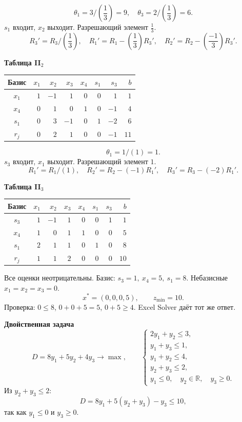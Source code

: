 \documentclass[12pt,a4paper]{article}
\begin{document}
\[\theta_{1}=3/(\frac{1}{3})=9,\quad \theta_{3}=2/(\frac{1}{3})=6.\]
$s_{1}$ входит, $x_{2}$ выходит. Разрешающий элемент $\frac{1}{3}$.
\[R_{3}'=R_{3}/(\frac{1}{3}),\quad R_{1}'=R_{1}-(\frac{1}{3})R_{3}',\quad R_{2}'=R_{2}-(\frac{-1}{3})R_{3}'.\]
\newpage
\par\textbf{Таблица II$_{2}$}\begin{center}\small\setlength{\tabcolsep}{4pt}\begin{tabular}{c|rrrrrr|r}\hline
Базис & $x_{1}$ & $x_{2}$ & $x_{3}$ & $x_{4}$ & $s_{1}$ & \cellcolor{cyan!18}$s_{3}$ & $b$\\\hline
\rowcolor{yellow!25}$x_{1}$ & $1$ & $-1$ & $1$ & $0$ & $0$ & \cellcolor{orange!45}$1$ & $1$\\
$x_{4}$ & $0$ & $1$ & $0$ & $1$ & $0$ & \cellcolor{cyan!18}$-1$ & $4$\\
$s_{1}$ & $0$ & $3$ & $-1$ & $0$ & $1$ & \cellcolor{cyan!18}$-2$ & $6$\\
\hline $r_j$ & $0$ & $2$ & $1$ & $0$ & $0$ & \cellcolor{cyan!18}$-1$ & $11$\\\hline\end{tabular}\end{center}
\[\theta_{1}=1/(1)=1.\]
$s_{3}$ входит, $x_{1}$ выходит. Разрешающий элемент $1$.
\[R_{1}'=R_{1}/(1),\quad R_{2}'=R_{2}-(-1)R_{1}',\quad R_{3}'=R_{3}-(-2)R_{1}'.\]
\par\textbf{Таблица II$_{3}$}\begin{center}\small\setlength{\tabcolsep}{4pt}\begin{tabular}{c|rrrrrr|r}\hline
Базис & $x_{1}$ & $x_{2}$ & $x_{3}$ & $x_{4}$ & $s_{1}$ & $s_{3}$ & $b$\\\hline
$s_{3}$ & $1$ & $-1$ & $1$ & $0$ & $0$ & $1$ & $1$\\
$x_{4}$ & $1$ & $0$ & $1$ & $1$ & $0$ & $0$ & $5$\\
$s_{1}$ & $2$ & $1$ & $1$ & $0$ & $1$ & $0$ & $8$\\
\hline $r_j$ & $1$ & $1$ & $2$ & $0$ & $0$ & $0$ & $10$\\\hline\end{tabular}\end{center}

Все оценки неотрицательны. Базис: $s_3=1,\ x_4=5,\ s_1=8$.
Небазисные $x_1=x_2=x_3=0$.
\[
\boxed{x^*=(0,0,0,5),\qquad z_{\min}=10.}
\]
Проверка: $0\le8$, $0+0+5=5$, $0+5\ge4$.
Excel Solver даёт тот же ответ.

\newpage
\par\textbf{Двойственная задача}
\[
D=8y_1+5y_2+4y_3\to\max,
\qquad
\begin{cases}
2y_1+y_2\le3,\\
y_1+y_3\le1,\\
y_1+y_2\le4,\\
y_2+y_3\le2,\\
y_1\le0,\quad y_2\in\mathbb R,\quad y_3\ge0.
\end{cases}
\]
Из $y_2+y_3\le2$:
\[
D=8y_1+5(y_2+y_3)-y_3\le10,
\]
так как $y_1\le0$ и $y_3\ge0$.
\end{document}
